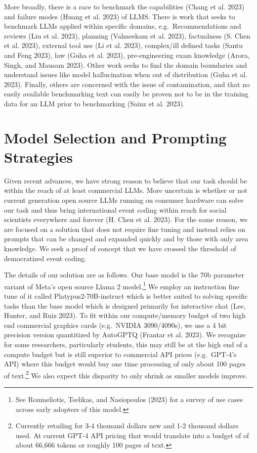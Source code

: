 \documentclass[
]{article}
\begin{document}
More broadly, there is a race to benchmark the capabilities (Chang et
al. 2023) and failure modes (Huang et al. 2023) of LLMS. There is work
that seeks to benchmark LLMs applied within specific domains,
e.g.~Recommendations and reviews (Liu et al. 2023), planning (Valmeekam
et al. 2023), factualness (S. Chen et al. 2023), external tool use (Li
et al. 2023), complex/ill defined tasks (Santu and Feng 2023), law (Guha
et al. 2023), pre-engineering exam knowledge (Arora, Singh, and Mausam
2023). Other work seeks to find the domain boundaries and understand
issues like model hallucination when out of distribution (Guha et al.
2023). Finally, others are concerned with the issue of contamination,
and that no easily available benchmarking text can easily be proven not
to be in the training data for an LLM prior to benchmarking (Sainz et
al. 2023).

\section{Model Selection and Prompting
Strategies}\label{model-selection-and-prompting-strategies}

Given recent advances, we have strong reason to believe that our task
should be within the reach of at least commercial LLMs. More uncertain
is whether or not current generation open source LLMs running on
consumer hardware can solve our task and thus bring international event
coding within reach for social scientists everywhere and forever (H.
Chen et al. 2023). For the same reason, we are focused on a solution
that does not require fine tuning and instead relies on prompts that can
be changed and expanded quickly and by those with only area knowledge.
We seek a proof of concept that we have crossed the threshold of
democratized event coding.

The details of our solution are as follows. Our base model is the 70b
parameter variant of Meta's open source Llama 2 model.\footnote{See
  Roumeliotis, Tselikas, and Nasiopoulos (2023) for a survey of use
  cases across early adopters of this model.} We employ an instruction
fine tune of it called Platypus2-70B-instruct which is better suited to
solving specific tasks than the base model which is designed primarily
for interactive chat (Lee, Hunter, and Ruiz 2023). To fit within our
compute/memory budget of two high end commercial graphics cards
(e.g.~NVIDIA 3090/4090s), we use a 4 bit precision version quantitized
by AutoGPTQ (Frantar et al. 2023). We recognize for some researchers,
particularly students, this may still be at the high end of a compute
budget but is still superior to commercial API prices (e.g.~GPT-4's API)
where this budget would buy one time processing of only about 100 pages
of text.\footnote{Currently retailing for 3-4 thousand dollars new and
  1-2 thousand dollars used. At current GPT-4 API pricing that would
  translate into a budget of of about 66,666 tokens or roughly 100 pages
  of text.} We also expect this disparity to only shrink as smaller
models improve.
\end{document}
